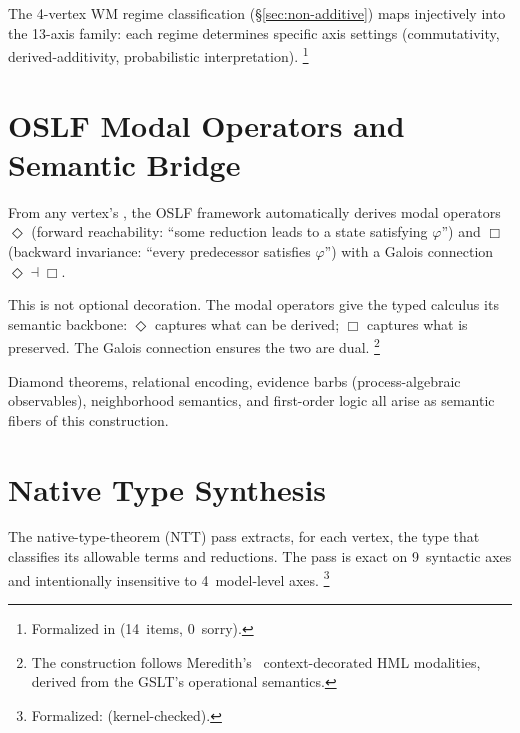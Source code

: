 \documentclass[11pt,openany]{report}
\begin{document}

\noindent
The 4-vertex WM regime classification
(\S\ref{sec:non-additive}) maps injectively into the 13-axis
family: each regime determines specific axis settings
(commutativity, derived-additivity, probabilistic
interpretation).%
\footnote{Formalized in
(14~items, 0~sorry).}


\section{OSLF Modal Operators and Semantic Bridge}

From any vertex's , the OSLF framework automatically
derives modal operators $\Diamond$ (forward reachability: ``some
reduction leads to a state satisfying $\varphi$'') and $\Box$
(backward invariance: ``every predecessor satisfies $\varphi$'') with
a Galois connection $\Diamond \dashv \Box$.

This is not optional decoration.  The modal operators give the typed
calculus its semantic backbone: $\Diamond$ captures what can be
derived; $\Box$ captures what is preserved.  The Galois connection
ensures the two are dual.%
\footnote{The construction follows
Meredith's~\cite{meredith2026ccc} context-decorated HML modalities,
derived from the GSLT's operational semantics.}

Diamond theorems, relational encoding, evidence barbs
(process-algebraic observables), neighborhood semantics, and
first-order logic all arise as semantic fibers of this construction.


\section{Native Type Synthesis}

The native-type-theorem (NTT) pass extracts, for each vertex, the
type that classifies its allowable terms and reductions.  The pass is
exact on 9~syntactic axes and intentionally insensitive to
4~model-level axes.%
\footnote{Formalized:  (kernel-checked).}
\end{document}
